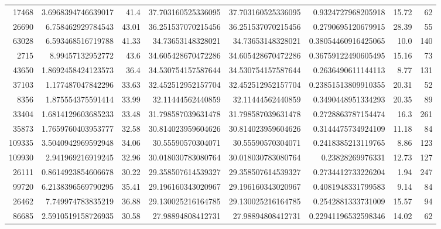 \documentclass[14pt]{article} %
\begin{document}
\begin{landscape}
\begin{spacing}{1.0}
\begin{table}[h]
\begin{tabular}{|r|r|r|r|r|r|r|r|}
17468&3.6968394746639017&41.4&37.703160525336095&37.703160525336095&0.9324727968205918&15.72&62\\
26690&6.758462929784543&43.01&36.251537070215456&36.251537070215456&0.2790695120679915&28.39&55\\
63028&6.593468516719788&41.33&34.73653148328021&34.73653148328021&0.38054460916425065&10.0&140\\
2715&8.99457132952772&43.6&34.605428670472286&34.605428670472286&0.36759122490605495&15.16&73\\
43650&1.8692458424123573&36.4&34.530754157587644&34.530754157587644&0.2636490611144113&8.77&131\\
37103&1.177487047842296&33.63&32.452512952157704&32.452512952157704&0.23851513809910355&20.31&52\\
8356&1.875554375591414&33.99&32.11444562440859&32.11444562440859&0.3490448951334293&20.35&89\\
33404&1.6814129603685233&33.48&31.798587039631478&31.798587039631478&0.2728863787154474&16.3&261\\
35873&1.7659760403953777&32.58&30.814023959604626&30.814023959604626&0.3144475734924109&11.18&84\\
109335&3.5040942969592948&34.06&30.55590570304071&30.55590570304071&0.2418385213119765&8.86&123\\
109930&2.941969216919245&32.96&30.018030783080764&30.018030783080764&0.23828269976331&12.73&127\\
26111&0.8614923854606678&30.22&29.358507614539327&29.358507614539327&0.2734412733226204&1.94&247\\
99720&6.2138396569790295&35.41&29.196160343020967&29.196160343020967&0.4081948331799583&9.14&84\\
26462&7.749974783835219&36.88&29.130025216164785&29.130025216164785&0.2542881333731009&15.57&94\\
86685&2.5910519158726935&30.58&27.98894808412731&27.98894808412731&0.22941196532598346&14.02&62\\
\hline 
\end{tabular}
\end{table}

\newpage


\end{spacing}
\end{landscape}
\end{document}
